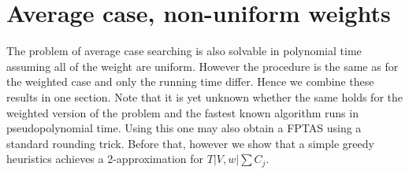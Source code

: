 \section{Average case, non-uniform weights}
The problem of average case searching is also solvable in polynomial time assuming all of the weight are uniform. However the procedure is the same as for the weighted case and only the running time differ. Hence we combine these results in one section. Note that it is yet unknown whether the same holds for the weighted version of the problem and the fastest known algorithm runs in pseudopolynomial time. Using this one may also obtain a FPTAS using a standard rounding trick. Before that, however we show that a simple greedy heuristics achieves a 2-approximation for $T|V,w|\sum C_j$.


